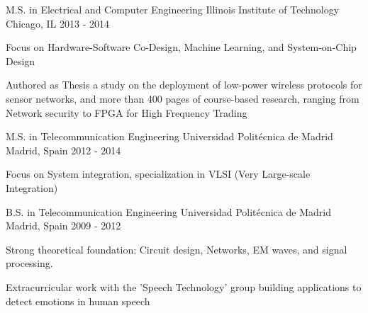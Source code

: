 

\begin{cventries}

  \cventry
    {M.S. in Electrical and Computer Engineering} %
    {Illinois Institute of Technology} %
    {Chicago, IL} %
    {2013 - 2014} %
    {
      \begin{cvitems} %
        \item {Focus on Hardware-Software Co-Design, Machine Learning, and System-on-Chip Design}
        \item {Authored as Thesis a study on the deployment of low-power wireless protocols for sensor networks, and more than 400 pages of course-based research, ranging from Network security to FPGA for High Frequency Trading}
      \end{cvitems}
    }

  \cventry
    {M.S. in Telecommunication Engineering} %
    {Universidad Politécnica de Madrid} %
    {Madrid, Spain} %
    {2012 - 2014} %
    {
      \begin{cvitems} %
        \item {Focus on System integration, specialization in VLSI (Very Large-scale Integration)}
      \end{cvitems}
    }

  \cventry
    {B.S. in Telecommunication Engineering} %
    {Universidad Politécnica de Madrid} %
    {Madrid, Spain} %
    {2009 - 2012} %
    {
      \begin{cvitems} %
        \item {Strong theoretical foundation: Circuit design, Networks, EM waves, and signal processing.}
        \item {Extracurricular work with the 'Speech Technology' group building applications to detect emotions in human speech}
      \end{cvitems}
    }

\end{cventries}
